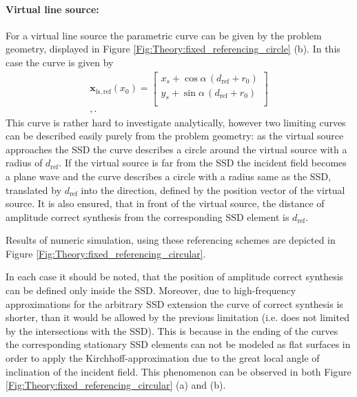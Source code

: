\documentclass[12pt,a4paper]{article}
\newcommand{\dref}{d_{\mathrm{ref}}}
\begin{document}
\paragraph{Virtual line source:\\}
For a virtual line source the parametric curve can be given by the problem geometry, displayed in Figure \ref{Fig:Theory:fixed_referencing_circle} (b).
In this case the curve is given by
\begin{eqnarray}
\mathbf{x}_{\mathrm{ls,ref}}(x_0) =  \begin{bmatrix} x_s + \cos\alpha \, (\dref + r_0)\\[0.3em] y_s + \sin\alpha\, (\dref+r_0) \\[0.3em]    \end{bmatrix} \\,
\label{Eq:Fixed_referencing_ls_circle}.
\end{eqnarray}
This curve is rather hard to investigate analytically, however two limiting curves can be described easily purely from the problem geometry: as the virtual source approaches the SSD the curve describes a circle around the virtual source with a radius of $\dref$. If the virtual source is far from the SSD the incident field becomes a plane wave and the curve describes a circle with a radius same as the SSD, translated by $\dref$ into the direction, defined by the position vector of the virtual source. %
It is also ensured, that in front of the virtual source, the distance of amplitude correct synthesis from the corresponding SSD element is $\dref$. %

Results of numeric simulation, using these referencing schemes are depicted in Figure \ref{Fig:Theory:fixed_referencing_circular}.

In each case it should be noted, that the position of amplitude correct synthesis can be defined only inside the SSD. Moreover, due to high-frequency approximations for the arbitrary SSD extension the curve of correct synthesis is shorter, than it would be allowed by the previous limitation (i.e. does not limited by the intersections with the SSD). This is because in the ending of the curves the corresponding stationary SSD elements can not be modeled as flat surfaces in order to apply the Kirchhoff-approximation due to the great local angle of inclination of the incident field. This phenomenon can be observed in both Figure \ref{Fig:Theory:fixed_referencing_circular} (a) and (b).
\end{document}
